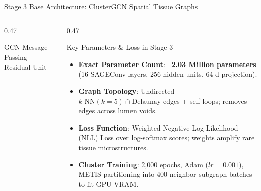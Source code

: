 \documentclass[aspectratio=169, 10pt]{beamer}
\begin{document}
\begin{frame}{Stage 3 Base Architecture: ClusterGCN Spatial Tissue Graphs}
\begin{columns}[onlytextwidth, t]
\begin{column}{0.47\textwidth}
\begin{block}{GCN Message-Passing Residual Unit}
{{
        }
      }
    \end{block}
  \end{column}
  \hfill
  \begin{column}{0.47\textwidth}
    \begin{block}{Key Parameters \& Loss in Stage 3}
      \parbox[t][2.85cm][t]{\linewidth}{
        \begin{itemize}\tiny
          \item \textbf{Exact Parameter Count}: \textbf{~2.03 Million parameters} (16 SAGEConv layers, 256 hidden units, 64-d projection).
          \item \textbf{Graph Topology}: Undirected $k\text{-NN} (k=5) \cap \text{Delaunay}$ edges + self loops; removes edges across lumen voids.
          \item \textbf{Loss Function}: Weighted Negative Log-Likelihood (NLL) Loss over log-softmax scores; weights amplify rare tissue microstructures.
          \item \textbf{Cluster Training}: 2,000 epochs, Adam ($lr=0.001$), METIS partitioning into 400-neighbor subgraph batches to fit GPU VRAM.
        \end{itemize}
      }
    \end{block}
  \end{column}
\end{columns}
\end{frame}
\end{document}
